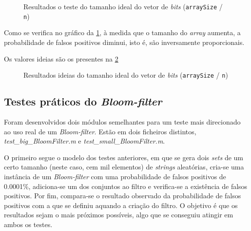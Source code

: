 \documentclass[a4paper,11pt,openright,oneside]{report}
\begin{document}
\begin{figure}[ht]	
\center
{}
\caption{Resultados o teste do tamanho ideal do vetor de \textit{bits} (\texttt{arraySize} / \texttt{n})}
\label{fig:optimalnimg}
\end{figure}

Como se verifica no gráfico da \ref{fig:optimalnimg}, à medida que o tamanho do \textit{array} aumenta, a probabilidade de falsos positivos diminui, isto é, são inversamente proporcionais.

Os valores ideias são os presentes na \ref{fig:optimalntext}

\begin{figure}[ht]	
\center
{}
\caption{Resultados ideias do tamanho ideal do vetor de \textit{bits} (\texttt{arraySize} / \texttt{n})}
\label{fig:optimalntext}
\end{figure}

\subsection{Testes práticos do \textit{Bloom-filter}}
\label{subsec.testebloom}

Foram desenvolvidos dois módulos semelhantes para um teste mais direcionado ao uso real de um \textit{Bloom-filter}. Estão em dois ficheiros distintos, \textit{test\_big\_BloomFilter.m} e \textit{test\_small\_BloomFilter.m}.

O primeiro segue o modelo dos testes anteriores, em que se gera dois \textit{sets} de um certo tamanho (neste caso, cem mil elementos) de \textit{strings} aleatórias, cria-se uma instância de um \textit{Bloom-filter} com uma probabilidade de falsos positivos de 0.0001\%, adiciona-se um dos conjuntos ao filtro e verifica-se a existência de falsos positivos. Por fim, compara-se o resultado observado da probabilidade de falsos positivos com a que se definiu aquando a criação do filtro. O objetivo é que os resultados sejam o mais próximos possíveis, algo que se conseguiu atingir em ambos os testes.
\end{document}
